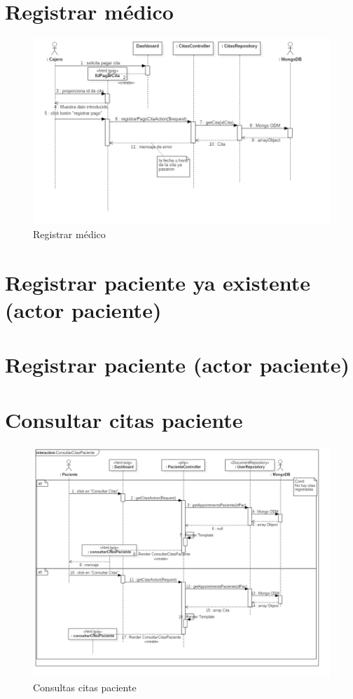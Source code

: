 \section{Registrar médico}

\begin{figure}[htbp!]
	\centering
	\includegraphics[width=1\textwidth]{uml/DiagramasSecuencia/DavidPacheco/pagar-cita-cita-expirada}
	\caption{Registrar médico}
\end{figure}

\section{Registrar paciente ya existente (actor paciente)}

\section{Registrar paciente (actor paciente)}


\section{Consultar citas paciente}
	\begin{figure}[htbp!]
		\centering
			\includegraphics[width=1\textwidth]{uml/DiagramasSecuencia/DemisGomez/consultarCitasPaciente}
		\caption{Consultas citas paciente}
	\end{figure}
	\newpage
